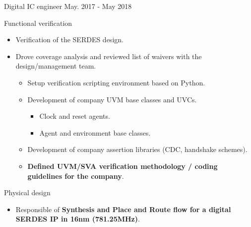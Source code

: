 \begin{cventries}
  \cventry
    {Digital IC engineer} %
    {} %
    {} %
    {May. 2017 - May 2018} %
    {
      \begin{cvitems} %
        \item {Functional verification}
        \begin{itemize}
          \item {Verification of the SERDES design.}
          \item {Drove coverage analysis and reviewed list of waivers with the design/management team.}
          \begin{itemize}
            \item {Setup verification scripting environment based on Python.}
            \item {Development of company UVM base classes and UVCs.}
              \begin{itemize}
                \item {Clock and reset agents.}
                \item {Agent and environment base classes.}
              \end{itemize}
            \item {Development of company assertion libraries (CDC, handshake schemes).}
            \item {\textbf{Defined UVM/SVA verification methodology / coding guidelines for the company}.}
          \end{itemize}
        \end{itemize}
        \item {Physical design}
        \begin{itemize}
          \item {Responsible of \textbf{Synthesis and Place and Route flow for a digital SERDES IP in 16nm (781.25MHz)}.}

\end{itemize}
\end{cvitems}}
\end{cventries}
